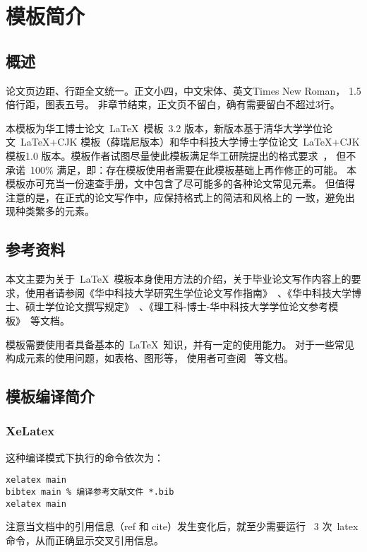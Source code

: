 
\chapter{模板简介}
\label{cha:intro}

\section{概述}
\label{sec:general intro}
论文页边距、行距全文统一。正文小四，中文宋体、英文Times New Roman， 1.5倍行距，图表五号。
非章节结束，正文页不留白，确有需要留白不超过3行。

本模板为华工博士论文~\LaTeX~模板~3.2
版本，新版本基于清华大学学位论文~\LaTeX+CJK
模板（薛瑞尼版本）和华中科技大学博士学位论文~\LaTeX+CJK 模板1.0
版本。模板作者试图尽量使此模板满足华工研院提出的格式要求~\cite{guide,standard}，
但不承诺~100\%
满足，即：存在模板使用者需要在此模板基础上再作修正的可能。
本模板亦可充当一份速查手册，文中包含了尽可能多的各种论文常见元素。
但值得注意的是，在正式的论文写作中，应保持格式上的简洁和风格上的
一致，避免出现种类繁多的元素。

\section{参考资料}
\label{sec:requirement}
本文主要为关于~\LaTeX~模板本身使用方法的介绍，关于毕业论文写作内容上的要求，使用者请参阅《华中科技大学研究生学位论文写作指南》~\cite{guide}、《华中科技大学博士、硕士学位论文撰写规定》~\cite{standard}、《理工科-博士-华中科技大学学位论文参考模板》~\cite{modal}等文档。

模板需要使用者具备基本的~\LaTeX~知识，并有一定的使用能力。
对于一些常见构成元素的使用问题，如表格、图形等，
使用者可查阅~ 等文档。
\section{模板编译简介}
\label{sec:compile}

\subsection{XeLatex}
\label{sec:xelatex}

这种编译模式下执行的命令依次为：
\begin{verbatim}
xelatex main 
bibtex main % 编译参考文献文件 *.bib
xelatex main
\end{verbatim}
注意当文档中的引用信息（ref 和 cite）发生变化后，就至少需要运行~
3 次~latex 命令，从而正确显示交叉引用信息。

